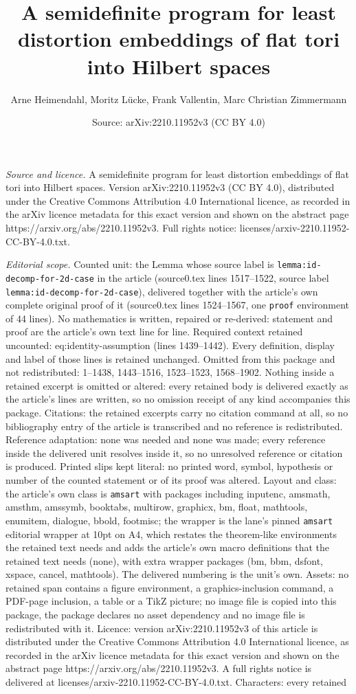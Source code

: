 \documentclass[10pt,a4paper]{amsart}
\title[A semidefinite program for least distortion embeddings of fl]{A semidefinite program for least distortion embeddings of flat tori into Hilbert spaces}
\author{Arne Heimendahl, Moritz L\"ucke, Frank Vallentin, Marc Christian Zimmermann}
\date{Source: arXiv:2210.11952v3 (CC BY 4.0)}
\begin{document}
\maketitle

\noindent\emph{Source and licence.} A semidefinite program for least distortion embeddings of flat tori into Hilbert spaces. Version arXiv:2210.11952v3 (CC BY 4.0), distributed under the Creative Commons Attribution 4.0 International licence, as recorded in the arXiv licence metadata for this exact version and shown on the abstract page https://arxiv.org/abs/2210.11952v3. Full rights notice: licenses/arxiv-2210.11952-CC-BY-4.0.txt.\par\smallskip

\noindent\textit{Editorial scope.} Counted unit: the Lemma whose source label is \texttt{lemma:id-decomp-for-2d-case} in the article (source0.tex lines 1517--1522, source label \texttt{lemma:id-decomp-for-2d-case}), delivered together with the article's own complete original proof of it (source0.tex lines 1524--1567, one \texttt{proof} environment of 44 lines). No mathematics is written, repaired or re-derived: statement and proof are the article's own text line for line. Required context retained uncounted: eq:identity-assumption (lines 1439--1442). Every definition, display and label of those lines is retained unchanged. Omitted from this package and not redistributed: 1--1438, 1443--1516, 1523--1523, 1568--1902. Nothing inside a retained excerpt is omitted or altered: every retained body is delivered exactly as the article's lines are written, so no omission receipt of any kind accompanies this package. Citations: the retained excerpts carry no citation command at all, so no bibliography entry of the article is transcribed and no reference is redistributed. Reference adaptation: none was needed and none was made; every reference inside the delivered unit resolves inside it, so no unresolved reference or citation is produced. Printed slips kept literal: no printed word, symbol, hypothesis or number of the counted statement or of its proof was altered. Layout and class: the article's own class is \texttt{amsart} with packages including inputenc, amsmath, amsthm, amssymb, booktabs, multirow, graphicx, bm, float, mathtools, enumitem, dialogue, bbold, footmisc; the wrapper is the lane's pinned \texttt{amsart} editorial wrapper at 10pt on A4, which restates the theorem-like environments the retained text needs and adds the article's own macro definitions that the retained text needs (none), with extra wrapper packages (bm, bbm, dsfont, xspace, cancel, mathtools). The delivered numbering is the unit's own. Assets: no retained span contains a figure environment, a graphics-inclusion command, a PDF-page inclusion, a table or a TikZ picture; no image file is copied into this package, the package declares no asset dependency and no image file is redistributed with it. Licence: version arXiv:2210.11952v3 of this article is distributed under the Creative Commons Attribution 4.0 International licence, as recorded in the arXiv licence metadata for this exact version and shown on the abstract page https://arxiv.org/abs/2210.11952v3. A full rights notice is delivered at licenses/arxiv-2210.11952-CC-BY-4.0.txt. Characters: every retained 
\end{document}

